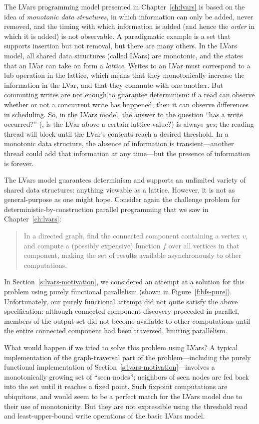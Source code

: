 The LVars programming model presented in Chapter~\ref{ch:lvars} is
based on the idea of \emph{monotonic data structures}, in which
information can only be added, never removed, and the timing with
which information is added (and hence the \emph{order} in which it is
added) is not observable.  A paradigmatic example is a set that
supports insertion but not removal, but there are many others.  In the
LVars model, all shared data structures (called LVars) are monotonic,
and the states that an LVar can take on form a \emph{lattice}.  Writes
to an LVar must correspond to a lub operation in the lattice, which
means that they monotonically increase the information in the LVar,
and that they commute with one another.  But commuting writes are not
enough to guarantee determinism: if a read can observe whether or not
a concurrent write has happened, then it can observe differences in
scheduling.  So, in the LVars model, the answer to the question ``has
a write occurred?''  (\ie, is the LVar above a certain lattice value?)
is always
\emph{yes}; the reading thread will block until the LVar's contents
reach a desired threshold.  In a monotonic data structure, the absence
of information is transient---another thread could add that
information at any time---but the presence of information is forever.

The LVars model guarantees determinism and supports an unlimited
variety of shared data structures: anything viewable as a lattice.
However, it is not as general-purpose as one might hope.  Consider
again the challenge problem for deterministic-by-construction parallel
programming that we saw in Chapter~\ref{ch:lvars}:
\begin{quote}
  In a directed graph, find the connected component containing a
  vertex $v$, and compute a (possibly expensive) function $f$ over all
  vertices in that component, making the set of results available
  asynchronously to other computations.
\end{quote}
In Section~\ref{s:lvars-motivation}, we considered an attempt at a
solution for this problem using purely functional parallelism (shown
in Figure~\ref{f:bfs-pure}).  Unfortunately, our purely functional
attempt did not quite satisfy the above specification: although
connected component discovery proceeded in parallel, members of the
output set did not become available to other computations until the
entire connected component had been traversed, limiting parallelism.

What would happen if we tried to solve this problem using LVars?  A
typical implementation of the graph-traversal part of the
problem---including the purely functional implementation of
Section~\ref{s:lvars-motivation}---involves a monotonically growing
set of ``seen nodes''; neighbors of seen nodes are fed back into the
set until it reaches a fixed point.  Such fixpoint computations are
ubiquitous, and would seem to be a perfect match for the LVars model
due to their use of monotonicity.  But they are not expressible using
the threshold read and least-upper-bound write operations of the basic
LVars model.

